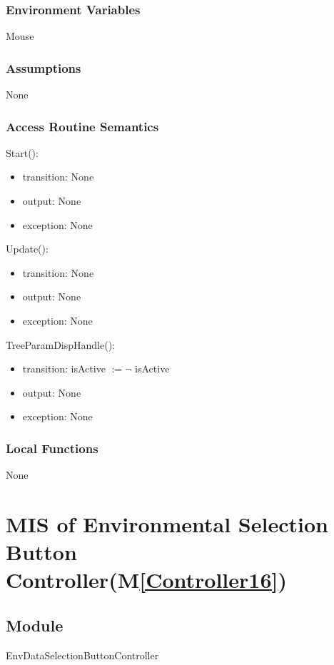 \documentclass[12pt, titlepage]{article}
\newcommand{\mref}[1]{M\ref{#1}}
\begin{document}
\subsubsection{Environment Variables}
Mouse
\subsubsection{Assumptions}
None
\subsubsection{Access Routine Semantics}

\noindent Start():
\begin{itemize}
\item transition: None
\item output: None
\item exception: None
\end{itemize}

\noindent Update():
\begin{itemize}
\item transition: None
\item output: None
\item exception: None
\end{itemize}

\noindent TreeParamDispHandle():
\begin{itemize}
\item transition: isActive $\mathit{:= \neg}$ isActive
\item output: None
\item exception: None
\end{itemize}
\subsubsection{Local Functions}
None


\newpage


\section{MIS of Environmental Selection Button Controller(\mref{Controller16})} 

\subsection{Module}
EnvDataSelectionButtonController
\end{document}
